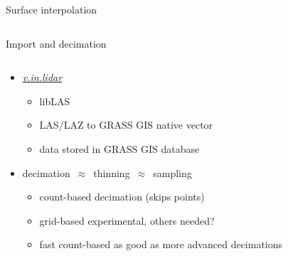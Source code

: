 \documentclass[xcolor={dvipsnames,usenames},beamer,aspectratio=43]{beamer}
\newcommand{\gmodule}[1]{\href{http://grass.osgeo.org/grass71/manuals/#1.html}{\emph{#1}}}
\begin{document}
\begin{frame}{Surface interpolation}
\begin{columns}
\begin{column}{0.4\textwidth}
\end{column}
\end{columns}

\end{frame}


\begin{frame}{Import and decimation}

\begin{columns}
\begin{column}{0.58\textwidth}

\begin{itemize}
  \item \gmodule{v.in.lidar}
  \begin{itemize}
   \item libLAS
   \item LAS/LAZ to GRASS GIS native vector
    \item data stored in GRASS GIS database
  \end{itemize}
  \item decimation~$\approx$~thinning~$\approx$~sampling
  \begin{itemize}
    \item count-based decimation (skips points)
    \item grid-based experimental, others needed?  %
    \item fast count-based as good as more advanced decimations
  \end{itemize}
\end{itemize}

\end{column}
\begin{column}{0.22\textwidth}



\end{column}
\end{columns}
\end{frame}
\end{document}
